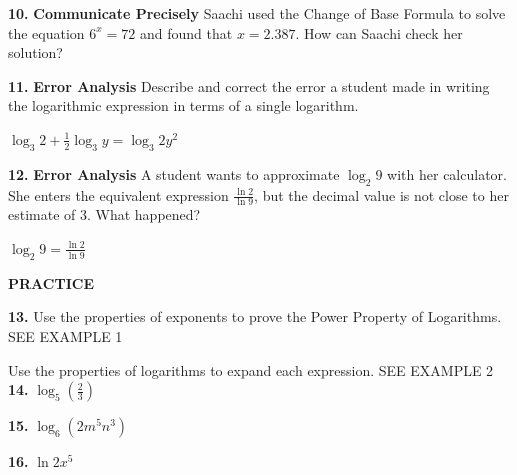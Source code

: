 \documentclass{article}
\newenvironment{practice}[2]{\textbf{#1.}}{}
\newcommand{\answer}[1]{}
\begin{document}
\begin{practice}{10}{}
\textbf{Communicate Precisely} Saachi used the Change of Base Formula to solve the equation $6^x = 72$ and found that $x = 2.387$. How can Saachi check her solution?
\answer{Evaluate $6^{2.387}$ and see if it is approximately 72.}
\end{practice}

\begin{practice}{11}{}
\textbf{Error Analysis} Describe and correct the error a student made in writing the logarithmic expression in terms of a single logarithm.

$\log_3 2 + \frac{1}{2}\log_3 y = \log_3 2y^2$ \quad [Incorrect]
\answer{The student brought the exponent in incorrectly. It should be $y^{1/2}$, not $y^2$. The correct expression is $\log_3(2\sqrt{y})$.}
\end{practice}

\begin{practice}{12}{}
\textbf{Error Analysis} A student wants to approximate $\log_2 9$ with her calculator. She enters the equivalent expression $\frac{\ln 2}{\ln 9}$, but the decimal value is not close to her estimate of 3. What happened?

$\log_2 9 = \frac{\ln 2}{\ln 9}$ \quad [Incorrect]
\answer{The student divided the log of the base by the log of the number. The Change of Base Formula gives $\frac{\ln 9}{\ln 2}$.}
\end{practice}

\vspace{1em}
\textbf{PRACTICE}

\begin{practice}{13}{}
Use the properties of exponents to prove the Power Property of Logarithms. SEE EXAMPLE 1
\answer{Let $x = \log_b m$, so $b^x = m$. Then $m^n = (b^x)^n = b^{nx}$. Therefore, $\log_b(m^n) = nx = n\log_b m$.}
\end{practice}

Use the properties of logarithms to expand each expression. SEE EXAMPLE 2
\begin{practice}{14}{}
$\log_5\left(\frac{2}{3}\right)$
\answer{$\log_5 2 - \log_5 3$}
\end{practice}

\begin{practice}{15}{}
$\log_6(2 m^5 n^3)$
\answer{$\log_6 2 + 5\log_6 m + 3\log_6 n$}
\end{practice}

\begin{practice}{16}{}
$\ln 2x^5$
\answer{$\ln 2 + 5\ln x$}
\end{practice}
\end{document}

